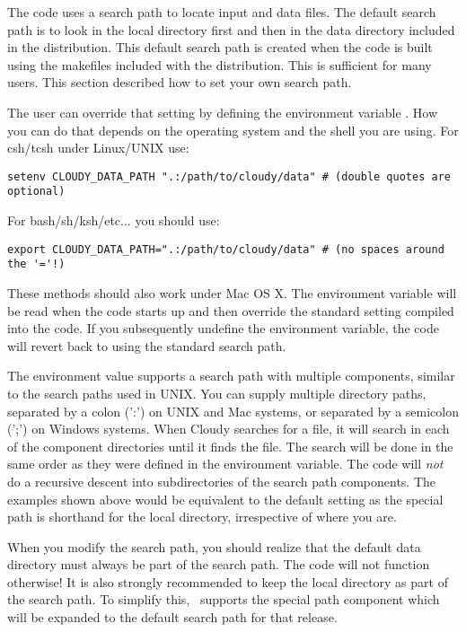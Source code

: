 The code uses a search path to locate input and data files. 
The default search path is to look in the local directory
first and then in the data directory included in the distribution. 
This default search path is created when the code is built using the makefiles included
with the distribution. 
This is sufficient for many users. 
This section described how to set your own search path.

The user
can override that setting by defining the environment variable
. How you can do that depends on the operating
system and the shell you are using. For csh/tcsh under Linux/UNIX use:
\begin{verbatim}
setenv CLOUDY_DATA_PATH ".:/path/to/cloudy/data" # (double quotes are optional)
\end{verbatim}
For bash/sh/ksh/etc... you should use:
\begin{verbatim}
export CLOUDY_DATA_PATH=".:/path/to/cloudy/data" # (no spaces around the '='!)
\end{verbatim}
These methods should also work under Mac OS X. The environment variable will
be read when the code starts up and then override the standard setting
compiled into the code. If you subsequently undefine the environment variable,
the code will revert back to using the standard search path.

The environment value  supports a search path
with multiple components, similar to the search paths used in UNIX. You can
supply multiple directory paths, separated by a colon (':') on UNIX and Mac
systems, or separated by a semicolon (';') on Windows systems. When Cloudy
searches for a file, it will search in each of the component directories until
it finds the file. The search will be done in the same order as they were
defined in the environment variable. The code will {\em not} do a recursive
descent into subdirectories of the search path components. The examples shown
above would be equivalent to the default setting as the special path
 is shorthand for the local directory, irrespective of where
you are.

When you modify the search path, you should realize that the default data
directory must always be part of the search path. The code will not function
otherwise! It is also strongly recommended to keep the local directory as part
of the search path. To simplify this, \Cloudy\ supports the special path
component  which will be expanded to the default search path
for that release.

